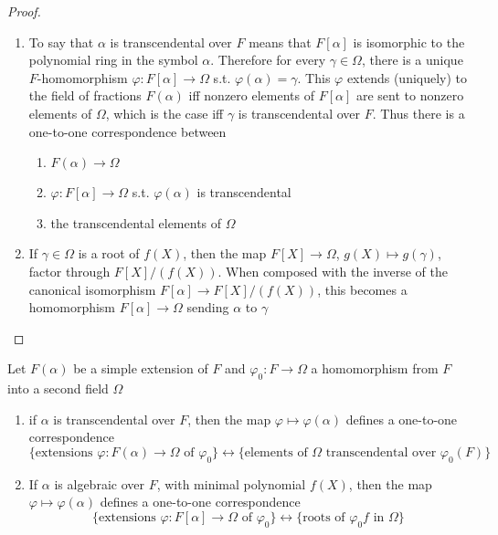 \documentclass[11pt]{article}
\begin{document}
\begin{proof}
\begin{enumerate}
\item To say that \(\alpha\) is transcendental over \(F\) means that \(F[\alpha]\) is isomorphic to the
polynomial ring in the symbol \(\alpha\). Therefore for every \(\gamma\in\Omega\), there is a
unique \(F\)-homomorphism \(\varphi:F[\alpha]\to\Omega\) s.t. \(\varphi(\alpha)=\gamma\). This \(\varphi\) extends (uniquely) to the
field of fractions \(F(\alpha)\) iff nonzero elements of \(F[\alpha]\) are sent to nonzero elements of
\(\Omega\), which is the case iff \(\gamma\) is transcendental over \(F\). Thus there is a one-to-one
correspondence between
\begin{enumerate}
\item \(F(\alpha)\to\Omega\)
\item \(\varphi:F[\alpha]\to\Omega\) s.t. \(\varphi(\alpha)\) is transcendental
\item the transcendental elements of \(\Omega\)
\end{enumerate}
\item If \(\gamma\in\Omega\) is a root of \(f(X)\), then the map \(F[X]\to\Omega\), \(g(X)\mapsto g(\gamma)\), factor
through \(F[X]/(f(X))\). When composed with the inverse of the canonical
isomorphism \(F[\alpha]\to F[X]/(f(X))\), this becomes a homomorphism \(F[\alpha]\to\Omega\) sending \(\alpha\) to \(\gamma\)
\end{enumerate}
\end{proof}

\begin{proposition}[]
\label{2.2}
Let \(F(\alpha)\) be a simple extension of \(F\) and \(\varphi_0:F\to\Omega\) a homomorphism from \(F\) into a
second field \(\Omega\)
\begin{center}\end{center}

\begin{enumerate}
\item if \(\alpha\) is transcendental over \(F\), then the map \(\varphi\mapsto\varphi(\alpha)\) defines a one-to-one
correspondence
\begin{equation*}
\{\text{extensions }\varphi:F(\alpha)\to\Omega\text{ of }\varphi_0\}\leftrightarrow\{\text{elements of $\Omega$ transcendental over $\varphi_0(F)$}\}
\end{equation*}
\item If \(\alpha\) is algebraic over \(F\), with minimal polynomial \(f(X)\), then the map \(\varphi\mapsto\varphi(\alpha)\)
defines a one-to-one correspondence
\begin{equation*}
\{\text{extensions }\varphi:F[\alpha]\to\Omega\text{ of }\varphi_0\}\leftrightarrow\{\text{roots of }\varphi_0f\text{ in }\Omega\}
\end{equation*}
\end{enumerate}
\end{proposition}
\end{document}

